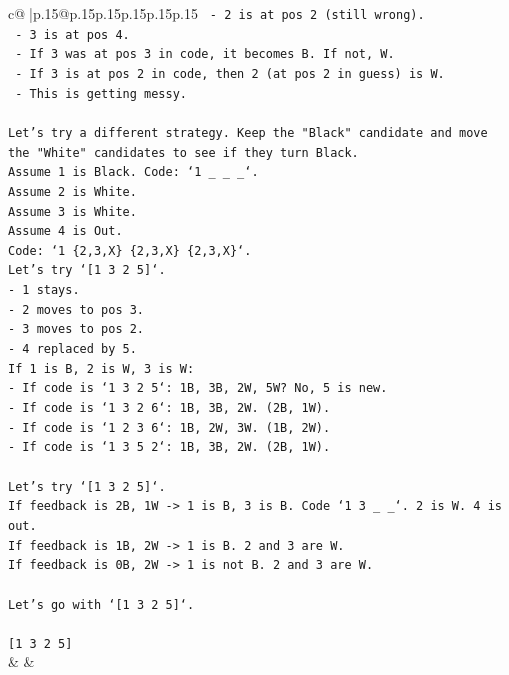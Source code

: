 \documentclass{article}
\begin{document}
{\begin{supertabular}{c@{$\;$}|p{.15\linewidth}@{}p{.15\linewidth}p{.15\linewidth}p{.15\linewidth}p{.15\linewidth}p{.15\linewidth}}
{{{\texttt{    {-} 2 is at pos 2 (still wrong).} \\
\texttt{    {-} 3 is at pos 4.} \\
\texttt{    {-} If 3 was at pos 3 in code, it becomes B. If not, W.} \\
\texttt{    {-} If 3 is at pos 2 in code, then 2 (at pos 2 in guess) is W.} \\
\texttt{    {-} This is getting messy.} \\
\\ 
\texttt{Let's try a different strategy. Keep the "Black" candidate and move the "White" candidates to see if they turn Black.} \\
\texttt{Assume 1 is Black. Code: `1 \_ \_ \_`.} \\
\texttt{Assume 2 is White.} \\
\texttt{Assume 3 is White.} \\
\texttt{Assume 4 is Out.} \\
\texttt{Code: `1 \{2,3,X\} \{2,3,X\} \{2,3,X\}`.} \\
\texttt{Let's try `{[}1 3 2 5{]}`.} \\
\texttt{{-} 1 stays.} \\
\texttt{{-} 2 moves to pos 3.} \\
\texttt{{-} 3 moves to pos 2.} \\
\texttt{{-} 4 replaced by 5.} \\
\texttt{If 1 is B, 2 is W, 3 is W:} \\
\texttt{{-} If code is `1 3 2 5`: 1B, 3B, 2W, 5W? No, 5 is new.} \\
\texttt{{-} If code is `1 3 2 6`: 1B, 3B, 2W. (2B, 1W).} \\
\texttt{{-} If code is `1 2 3 6`: 1B, 2W, 3W. (1B, 2W).} \\
\texttt{{-} If code is `1 3 5 2`: 1B, 3B, 2W. (2B, 1W).} \\
\\ 
\texttt{Let's try `{[}1 3 2 5{]}`.} \\
\texttt{If feedback is 2B, 1W {-}> 1 is B, 3 is B. Code `1 3 \_ \_`. 2 is W. 4 is out.} \\
\texttt{If feedback is 1B, 2W {-}> 1 is B. 2 and 3 are W.} \\
\texttt{If feedback is 0B, 2W {-}> 1 is not B. 2 and 3 are W.} \\
\\ 
\texttt{Let's go with `{[}1 3 2 5{]}`.} \\
\\ 
\texttt{{[}1 3 2 5{]}} \\
            }
        }
    }
    & & \\ \\


\end{supertabular}}
\end{document}
